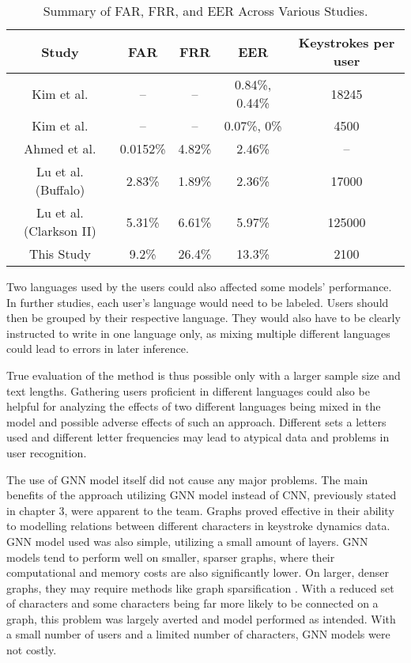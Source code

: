 \begin{center}
	\begin{table}[H]
		\begin{center}
			\begin{tabular}{ |c|c|c|c|c| } 
				\hline
				Study & FAR & FRR & EER & Keystrokes per user \\
				\hline
				Kim et al. \cite{kim2018} & -- & -- & 0.84\%, 0.44\% & 18245 \\
				\hline
				Kim et al. \cite{kim2020} & -- & -- & 0.07\%, 0\% & 4500 \\
				\hline
				Ahmed et al. \cite{ahmed2013} & 0.0152\% & 4.82\% & 2.46\% & -- \\
				\hline
				Lu et al. \cite{Lu2020} (Buffalo) & 2.83\% & 1.89\% & 2.36\% & 17000 \\
                \hline
                Lu et al. \cite{Lu2020} (Clarkson II) & 5.31\% & 6.61\% & 5.97\% & 125000 \\
                \hline
				This Study & 9.2\% & 26.4\% & 13.3\% & 2100 \\
				\hline
			\end{tabular}
		\end{center}
		\caption{Summary of FAR, FRR, and EER Across Various Studies.}
		\label{table:studies_results}
	\end{table}
\end{center}

Two languages used by the users could also affected some models' performance. In further studies, each user's language would need to be labeled. Users should then be grouped by their respective language. They would also have to be clearly instructed to write in one language only, as mixing multiple different languages could lead to errors in later inference. 

True evaluation of the method is thus possible only with a larger sample size and text lengths. Gathering users proficient in different languages could also be helpful for analyzing the effects of two different languages being mixed in the model and possible adverse effects of such an approach. Different sets a letters used and different letter frequencies may lead to atypical data and problems in user recognition.

The use of GNN model itself did not cause any major problems. The main benefits of the approach utilizing GNN model instead of CNN, previously stated in chapter 3, were apparent to the team. Graphs proved effective in their ability to modelling relations between different characters in keystroke dynamics data. GNN model used was also simple, utilizing a small amount of layers. GNN models tend to perform well on smaller, sparser graphs, where their computational and memory costs are also significantly lower. On larger, denser graphs, they may require methods like graph sparsification \cite{zhang2024graphsparsificationmixturegraphs}. With a reduced set of characters and some characters being far more likely to be connected on a graph, this problem was largely averted and model performed as intended.  With a small number of users and a limited number of characters, GNN models were not costly. 